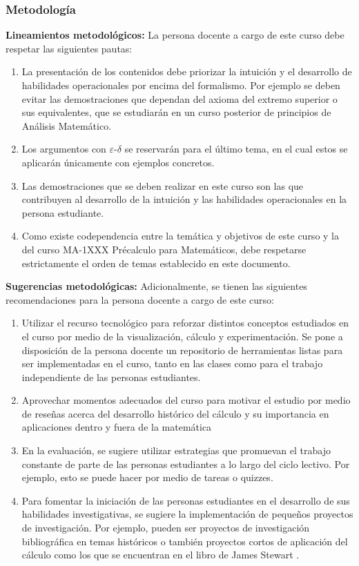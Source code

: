\begin{refsection}
\begin{enumerate}
\end{enumerate}

\subsubsection*{Metodología}

\noindent \textbf{Lineamientos metodológicos:} La persona docente a cargo de este curso debe respetar las siguientes pautas:
\begin{enumerate}
    \item La presentación de los contenidos debe priorizar la intuición y el desarrollo de habilidades operacionales por encima del formalismo. Por ejemplo se deben evitar las demostraciones que dependan del axioma del extremo superior o sus equivalentes, que se estudiarán en un curso posterior de principios de Análisis Matemático.
    \item Los argumentos con $\varepsilon$-$\delta$ se reservarán para el último tema, en el cual estos se aplicarán únicamente con ejemplos concretos.
    \item Las demostraciones que se deben realizar en este curso son las que contribuyen al desarrollo de la intuición y las habilidades operacionales en la persona estudiante.
    \item Como existe codependencia entre la temática y objetivos de este curso y la del curso MA-1XXX Précalculo para Matemáticos, debe respetarse estrictamente el orden de temas establecido en este documento.
\end{enumerate}

\textbf{Sugerencias metodológicas:} Adicionalmente, se tienen las siguientes recomendaciones para la persona docente a cargo de este curso:
\begin{enumerate}
    \item Utilizar el recurso tecnológico para reforzar distintos conceptos estudiados en el curso por medio de la visualización, cálculo y experimentación. Se pone a disposición de la persona docente un repositorio de herramientas listas para ser implementadas en el curso, tanto en las clases como para el trabajo independiente de las personas estudiantes.
    \item Aprovechar momentos adecuados del curso para motivar el estudio por medio de reseñas acerca del desarrollo histórico del cálculo y su importancia en aplicaciones dentro y fuera de la matemática
    \item En la evaluación, se sugiere utilizar estrategias que promuevan el trabajo constante de parte de las personas estudiantes a lo largo del ciclo lectivo. Por ejemplo, esto se puede hacer por medio de tareas o quizzes.
    \item Para fomentar la iniciación de las personas estudiantes en el desarrollo de sus habilidades investigativas, se sugiere la implementación de pequeños proyectos de investigación. Por ejemplo, pueden ser proyectos de investigación bibliográfica en temas históricos o también proyectos cortos de aplicación del cálculo como los que se encuentran en el libro de James Stewart \cite{Ste18}.
\end{enumerate}





\end{refsection}
